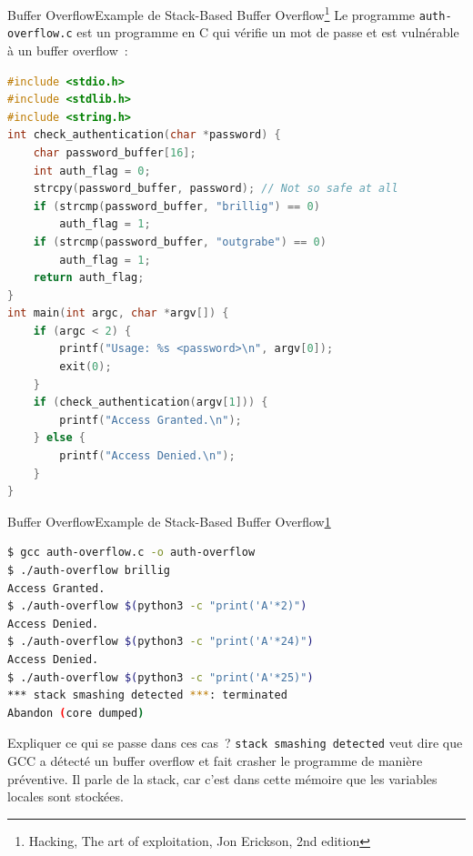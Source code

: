 \documentclass{beamer}
\begin{document}
    \begin{frame}[fragile]{Buffer Overflow}{Example de Stack-Based Buffer Overflow\footnote{\label{hacking}Hacking, The art of exploitation, Jon Erickson, 2nd edition}}
        Le programme \lstinline{auth-overflow.c} est un programme en C qui vérifie un mot de passe et est vulnérable à un buffer overflow~:
        \begin{lstlisting}[language=C,basicstyle=\tiny\ttfamily]
#include <stdio.h>
#include <stdlib.h>
#include <string.h>
int check_authentication(char *password) {
    char password_buffer[16];
    int auth_flag = 0;
    strcpy(password_buffer, password); // Not so safe at all
    if (strcmp(password_buffer, "brillig") == 0)
        auth_flag = 1;
    if (strcmp(password_buffer, "outgrabe") == 0)
        auth_flag = 1;
    return auth_flag;
}
int main(int argc, char *argv[]) {
    if (argc < 2) {
        printf("Usage: %s <password>\n", argv[0]);
        exit(0);
    }
    if (check_authentication(argv[1])) {
        printf("Access Granted.\n");
    } else {
        printf("Access Denied.\n");
    }
}
        \end{lstlisting}
    \end{frame}

    \begin{frame}[fragile]{Buffer Overflow}{Example de Stack-Based Buffer Overflow\cref{hacking}}
        \begin{lstlisting}[language=bash]
$ gcc auth-overflow.c -o auth-overflow
$ ./auth-overflow brillig
Access Granted.
$ ./auth-overflow $(python3 -c "print('A'*2)")
Access Denied.
$ ./auth-overflow $(python3 -c "print('A'*24)")
Access Denied.
$ ./auth-overflow $(python3 -c "print('A'*25)")
*** stack smashing detected ***: terminated
Abandon (core dumped)
        \end{lstlisting}
        Expliquer ce qui se passe dans ces cas~?
        \pause
        \bigbreak
        \lstinline{stack smashing detected} veut dire que GCC a détecté un buffer overflow et fait crasher le programme de manière préventive.
        Il parle de la stack, car c'est dans cette mémoire que les variables locales sont stockées.
    \end{frame}
\end{document}
